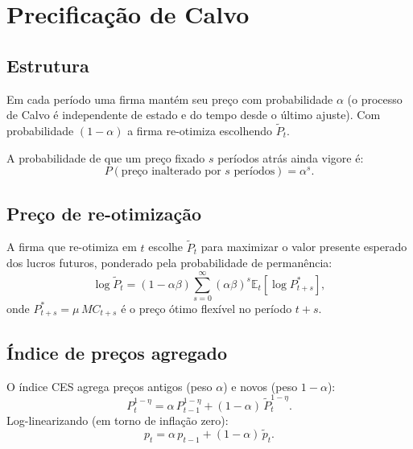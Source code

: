 \documentclass[11pt,a4paper]{article}
\newcommand{\E}{\mathbb{E}}
\begin{document}
\section{Precificação de Calvo}

\subsection{Estrutura}

Em cada período uma firma mantém seu preço com probabilidade $\alpha$ (o
processo de Calvo é independente de estado e do tempo desde o último ajuste).
Com probabilidade $(1-\alpha)$ a firma re-otimiza escolhendo $\tilde{P}_t$.

A probabilidade de que um preço fixado $s$ períodos atrás ainda vigore é:
\begin{equation}
  P(\text{preço inalterado por }s\text{ períodos}) = \alpha^s.
\end{equation}

\subsection{Preço de re-otimização}

A firma que re-otimiza em $t$ escolhe $\tilde{P}_t$ para maximizar o valor
presente esperado dos lucros futuros, ponderado pela probabilidade de
permanência:
\begin{equation}\label{eq:reset_price}
  \log\tilde{P}_t = (1-\alpha\beta)\sum_{s=0}^{\infty}(\alpha\beta)^s
                    \E_t\!\left[\log P_{t+s}^* \right],
\end{equation}
onde $P_{t+s}^* = \mu\,MC_{t+s}$ é o preço ótimo flexível no período $t+s$.

\subsection{Índice de preços agregado}

O índice CES agrega preços antigos (peso $\alpha$) e novos (peso $1-\alpha$):
\begin{equation}\label{eq:price_index}
  P_t^{1-\eta} = \alpha\,P_{t-1}^{1-\eta} + (1-\alpha)\,\tilde{P}_t^{1-\eta}.
\end{equation}
Log-linearizando (em torno de inflação zero):
\begin{equation}\label{eq:price_index_log}
  p_t = \alpha\,p_{t-1} + (1-\alpha)\,\tilde{p}_t.
\end{equation}
\end{document}
